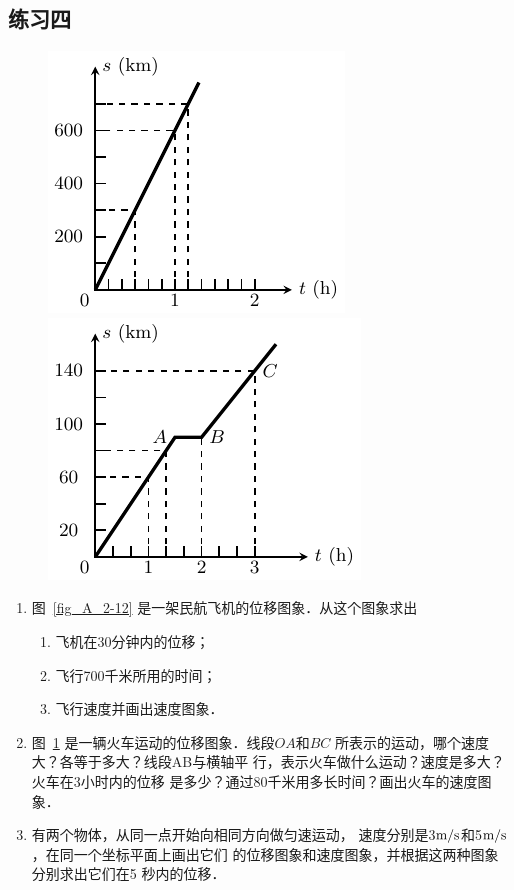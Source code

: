 \subsection*{练习四}
\begin{figure}[htp]
    \centering
    \begin{minipage}[t]{0.48\textwidth}
        \centering
        \includegraphics{fig/A/2-12.pdf}
        \caption{}\label{fig_A_2-12}
    \end{minipage}
    \begin{minipage}[t]{0.48\textwidth}
        \centering
        \includegraphics{fig/A/2-13.pdf}
        \caption{}\label{fig_A_2-13}
    \end{minipage}
\end{figure}

\begin{enumerate}
\item 
图~\ref{fig_A_2-12} 是一架民航飞机的位移图象．从这个图象求出
\begin{enumerate}
    \item 飞机在30分钟内的位移；
    \item 飞行700千米所用的时间；
    \item 飞行速度并画出速度图象．
\end{enumerate}

\item  
图~\ref{fig_A_2-13} 是一辆火车运动的位移图象．线段$OA$和$BC$
所表示的运动，哪个速度大？各等于多大？线段AB与横轴平
行，表示火车做什么运动？速度是多大？火车在3小时内的位移
是多少？通过80千米用多长时间？画出火车的速度图象．


\item  
有两个物体，从同一点开始向相同方向做匀速运动，
速度分别是3$\text{m}/\text{s}$和5$\text{m}/\text{s}$，在同一个坐标平面上画出它们
的位移图象和速度图象，并根据这两种图象分别求出它们在5
秒内的位移．

\end{enumerate}


